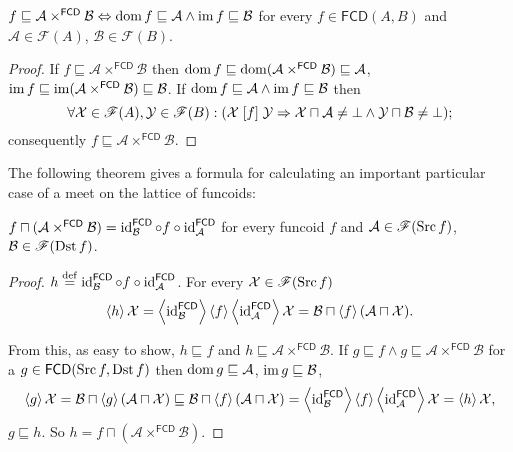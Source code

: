 \begin{prop}
$f\sqsubseteq\mathcal{A}\times^{\mathsf{FCD}}\mathcal{B}\Leftrightarrow\operatorname{dom}
f\sqsubseteq\mathcal{A}\land\operatorname{im} f\sqsubseteq\mathcal{B}$
for every $f\in\mathsf{FCD}(A,B)$ and $\mathcal{A}\in\mathscr{F}(A)$,
$\mathcal{B}\in\mathscr{F}(B)$.\end{prop}
\begin{proof}
If $f\sqsubseteq\mathcal{A}\times^{\mathsf{FCD}}\mathcal{B}$ then
$\operatorname{dom}
f\sqsubseteq\operatorname{dom}(\mathcal{A}\times^{\mathsf{FCD}}\mathcal{B})\sqsubseteq\mathcal
{A}$,
$\operatorname{im}
f\sqsubseteq\operatorname{im}(\mathcal{A}\times^{\mathsf{FCD}}\mathcal{B})\sqsubseteq\mathcal{
B}$.
If $\operatorname{dom} f\sqsubseteq\mathcal{A}\land\operatorname{im} f\sqsubseteq\mathcal{B}$
then
\[
\forall\mathcal{X}\in\mathscr{F}(A),\mathcal{Y}\in\mathscr{F}(B):(\mathcal{X}
\mathrel{\left[f\right]}\mathcal{Y}\Rightarrow\mathcal{X}\sqcap\mathcal{A}\ne\bot
\land\mathcal{Y}\sqcap\mathcal{B}\ne\bot);
\]
consequently $f\sqsubseteq\mathcal{A}\times^{\mathsf{FCD}}\mathcal{B}$.
\end{proof}
The following theorem gives a formula for calculating an important
particular case of a meet on the lattice of funcoids:
\begin{thm}
$f\sqcap(\mathcal{A}\times^{\mathsf{FCD}}\mathcal{B})=\operatorname{id}_{\mathcal{B}}^{\mathsf
{FCD}}\circ f\circ\operatorname{id}_{\mathcal{A}}^{\mathsf{FCD}}$
for every funcoid $f$ and $\mathcal{A}\in\mathscr{F}(\operatorname{Src} f)$,
$\mathcal{B}\in\mathscr{F}(\operatorname{Dst} f)$.\end{thm}
\begin{proof}
$h\overset{\mathrm{def}}{=}\operatorname{id}_{\mathcal{B}}^{\mathsf{FCD}}\circ
f\circ\operatorname{id}_{\mathcal{A}}^{\mathsf{FCD}}$.
For every $\mathcal{X}\in\mathscr{F}(\operatorname{Src} f)$
\[
\left\langle h\right\rangle\mathcal{X}=\left\langle \operatorname{id}_{\mathcal{B}}^{\mathsf{FCD}}\right\rangle\left\langle f\right\rangle\left\langle \operatorname{id}_{\mathcal{A}}^{\mathsf{FCD}}\right\rangle\mathcal{X}=\mathcal{B}\sqcap\left\langle f\right\rangle(\mathcal{A}\sqcap\mathcal{X}).
\]


From this, as easy to show, $h\sqsubseteq f$ and
$h\sqsubseteq\mathcal{A}\times^{\mathsf{FCD}}\mathcal{B}$.
If $g\sqsubseteq f\land g\sqsubseteq\mathcal{A}\times^{\mathsf{FCD}}\mathcal{B}$
for a $g\in\mathsf{FCD}(\operatorname{Src} f,\operatorname{Dst} f)$ then $\operatorname{dom} g\sqsubseteq\mathcal{A}$,
$\operatorname{im} g\sqsubseteq\mathcal{B}$,
\[
\left\langle g\right\rangle\mathcal{X}=\mathcal{B}\sqcap\left\langle g\right\rangle(\mathcal{A}\sqcap\mathcal{X})\sqsubseteq\mathcal{B}\sqcap\left\langle f\right\rangle(\mathcal{A}\sqcap\mathcal{X})=\left\langle \operatorname{id}_{\mathcal{B}}^{\mathsf{FCD}}\right\rangle\left\langle f\right\rangle\left\langle \operatorname{id}_{\mathcal{A}}^{\mathsf{FCD}}\right\rangle\mathcal{X}=\left\langle h\right\rangle\mathcal{X},
\]
$g\sqsubseteq h$. So
$h=f\sqcap(\mathcal{A}\times^{\mathsf{FCD}}\mathcal{B})$.\end{proof}
